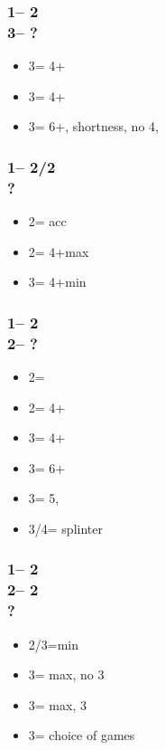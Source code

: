 \documentclass[12pt, a4paper]{article}
\begin{document}
\subsubsection*{1\nt -- 2\clubs\\
                3\clubs -- ?}
\begin{itemize}
    \item 3\diams = 4+\hearts
    \item 3\hearts = 4+\spades
    \item 3\spades = 6+\diams, \clubs shortness, no 4\major, \gf
\end{itemize}

\subsubsection*{1\nt -- 2\diams/2\hearts\\
                ?}
\begin{itemize}
    \item 2\major = acc
    \item 2\nt = 4+\major max
    \item 3\major = 4+\major min
\end{itemize}

\subsubsection*{1\nt -- 2\diams\\
                2\hearts -- ?}
\begin{itemize}
    \item 2\spades = \inv
    \item 2\nt = 4+\clubs \gf
    \item 3\clubs = 4+\diams \gf
    \item 3\diams = 6+\hearts \gf
    \item 3\hearts = 5\spades, \inv
    \item 3\spades/4\minor = splinter
\end{itemize}

\subsubsection*{1\nt -- 2\diams\\
                2\hearts -- 2\spades\\
                ?}
\begin{itemize}
    \item 2\nt/3\hearts =min
    \item 3\clubs = max, no 3\hearts
    \item 3\diams = max, 3\hearts
    \item 3\nt = choice of games
\end{itemize}
\end{document}
